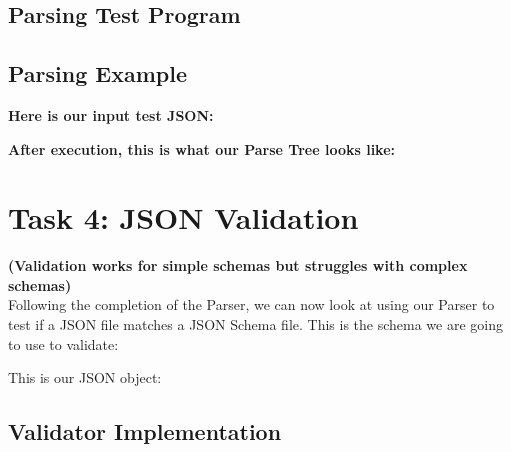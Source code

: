 \documentclass[a4paper]{article}
\begin{document}
\subsection*{Parsing Test Program}



\newpage

\subsection*{Parsing Example}

\textbf{Here is our input test JSON:}


\noindent \textbf{After execution, this is what our Parse Tree looks like:}



\newpage


\section{Task 4: JSON Validation}
\textbf{(Validation works for simple schemas but struggles with complex schemas)} \\
Following the completion of the Parser, we can now look at using our Parser to test if a JSON file matches a JSON Schema file.
This is the schema we are going to use to validate:


\noindent This is our JSON object:




\newpage
\subsection*{Validator Implementation}


\end{document}
